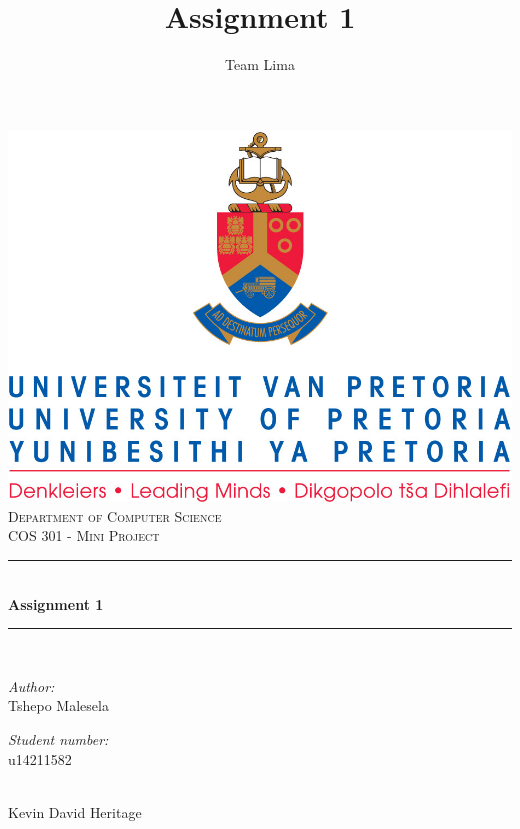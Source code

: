 \documentclass[a4paper,12pt]{report}
\author{Team Lima}
\title{ Assignment 1}
\newcommand{\HRule}{\rule{\linewidth}{0.5mm}}
\begin{document}
\setlength{\parskip}{6pt}

\begin{titlepage}

\begin{center}
\includegraphics[width=1\textwidth]{./up-logo.jpg}\\[0.4cm]    
\textsc{\LARGE Department of Computer Science}\\[1.5cm]
\textsc{\Large COS 301 - Mini Project}\\[0.5cm]
\HRule \\[0.4cm]
{ \huge \bfseries Assignment 1}\\[0.4cm]
\HRule \\[0.4cm]
\begin{minipage}{0.4\textwidth}
\begin{flushleft} \large
\emph{Author:}\\
Tshepo {Malesela}
\end{flushleft}
\end{minipage}
\begin{minipage}{0.4\textwidth}
\begin{flushright} \large
\emph{Student number:} \\
u14211582
\end{flushright}
\end{minipage}
\begin{minipage}{0.4\textwidth}
\begin{flushleft} \large
\emph{} \\
Kevin David {Heritage}
\end{flushleft}

\end{minipage}
\end{center}
\end{titlepage}
\end{document}
